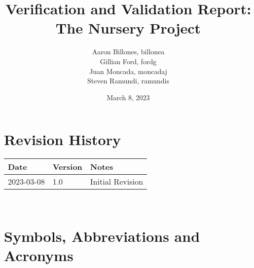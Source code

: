 \documentclass[12pt, titlepage]{article}
\begin{document}
\title{Verification and Validation Report: The Nursery Project} 
\author{Aaron Billones, billonea\\Gillian Ford, fordg\\Juan Moncada, moncadaj\\Steven Ramundi, ramundis}
\date{March 8, 2023}
	
\maketitle


\section{Revision History}

\begin{tabularx}{\textwidth}{p{3cm}p{2cm}X}
\toprule {\bf Date} & {\bf Version} & {\bf Notes}\\
\midrule
2023-03-08 & 1.0 & Initial Revision\\

\bottomrule
\end{tabularx}

~\newpage

\section{Symbols, Abbreviations and Acronyms}
\end{document}

